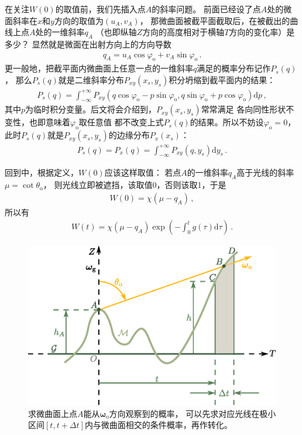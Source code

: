 在关注$W(0)$的取值前，我们先插入点$A$的斜率问题。
前面已经设了点$A$处的微面斜率在$x$和$y$方向的取值为$(u_A,v_A)$，
那微曲面被截平面截取后，在被截出的曲线上点$A$处的一维斜率$q_A$
（也即纵轴$Z$方向的高度相对于横轴$T$方向的变化率）是多少？
显然就是微面在出射方向上的方向导数
\begin{align}
    q_A=u_A\cos\varphi_{\mathrm{o}}+v_A\sin\varphi_{\mathrm{o}}\, .
\end{align}
更一般地，把截平面内微曲面上任意一点的一维斜率$q$满足的概率分布记作$P_s(q)$，
那么$P_s(q)$就是二维斜率分布$P_{xy}(x_s,y_s)$积分坍缩到截平面内的结果：
\begin{align}
    P_s(q)=\int_{-\infty}^{+\infty}P_{xy}(q\cos\varphi_{\mathrm{o}}-p\sin\varphi_{\mathrm{o}},
    q\sin\varphi_{\mathrm{o}}+p\cos\varphi_{\mathrm{o}})\mathrm{d}p\, ,
\end{align}
其中$p$为临时积分变量。后文将会介绍到，$P_{xy}(x_s,y_s)$常常满足
各向同性形状不变性，也即意味着$\varphi_{\mathrm{o}}$取任意值
都不改变上式$P_s(q)$的结果。所以不妨设$\varphi_{\mathrm{o}}=0$，
此时$P_s(q)$就是$P_{xy}(x_s,y_s)$的边缘分布$P_x(x_s)$：
\begin{align}\label{eq:08-ex01-condition-1d-slope}
    P_s(q)=P_x(q)=\int_{-\infty}^{+\infty}P_{xy}(q,y_s)\mathrm{d}y_s\, .
\end{align}

回到中，根据定义，$W(0)$应该这样取值：
若点$A$的一维斜率$q_A$高于光线的斜率$\mu=\cot\theta_{\mathrm{o}}$，
则光线立即被遮挡，该取值0，否则该取1，于是
\begin{align}
    W(0)=\chi(\mu-q_A)\, ,
\end{align}
所以有
\begin{align}\label{eq:08ex01-Wt-gt-int}
    W(t)=\chi(\mu-q_A)\exp\left(-\int_{0}^{t}g(\tau)\mathrm{d}\tau\right)\, .
\end{align}

\begin{figure}[htbp]
    \centering
    \includegraphics[width=0.8\linewidth]{Pictures/chap08/GeometryForSmithShadowingMasking.eps}
    \caption{求微曲面上点$A$能从${\bm\omega}_{\mathrm{o}}$方向观察到的概率，
    可以先求对应光线在极小区间$[t,t+\Delta t]$内与微曲面相交的条件概率，再作转化。}
    \label{fig:08ex01-G1Geometry}
\end{figure}

